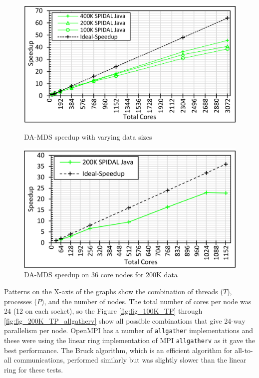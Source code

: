 \begin{figure}[!htb]   
	\centering 
    \begin{minipage}{0.49\textwidth}
        \centering
        \includegraphics[width=0.85\columnwidth]{figures/fig_speedup}
		\caption{DA-MDS speedup with varying data sizes}
		\label{fig:fig_seepdup}
    \end{minipage}
    \begin{minipage}{0.49\textwidth}
        \centering
        \includegraphics[width=0.85\columnwidth]{figures/fig_speedup_36core}
		\caption{DA-MDS speedup on 36 core nodes for 200K data}
		\label{fig:fig_seepdup_36core}
    \end{minipage}    
\end{figure}

Patterns on the X-axis of the graphs show the combination of threads ($T$), processes ($P$), and the number of nodes. The total number of cores per node was 24 (12 on each socket), so the Figure \ref{fig:fig_100K_TP} through \ref{fig:fig_200K_TP_allgatherv} show all possible combinations that give 24-way parallelism per node. OpenMPI has a number of \texttt{allgather} implementations and these were using the linear ring implementation of MPI \texttt{allgatherv} as it gave the best performance. The Bruck \cite{Bruck:1997:EAA:271425.271434} algorithm, which is an efficient algorithm for all-to-all communications, performed similarly but was slightly slower than the linear ring for these tests.

